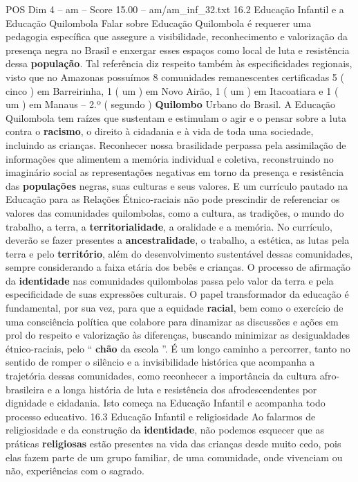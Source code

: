 \begin{textsample}{POS Dim 4 – am – Score 15.00 – am/am\_inf\_32.txt}  \label{ex:f4_pos_103}
16.2 Educação Infantil e a Educação Quilombola Falar sobre Educação Quilombola é requerer uma pedagogia específica que assegure a visibilidade, reconhecimento e valorização da presença negra no Brasil e enxergar esses espaços como local de luta e resistência dessa \textbf{população}.
Tal referência diz respeito também às especificidades regionais, visto que no Amazonas possuímos 8 comunidades remanescentes certificadas 5 ( cinco ) em Barreirinha, 1 ( um ) em Novo Airão, 1 ( um ) em Itacoatiara e 1 ( um ) em Manaus – 2.º ( segundo ) \textbf{Quilombo} Urbano do Brasil.
A Educação Quilombola tem raízes que sustentam e estimulam o agir e o pensar sobre a luta contra o \textbf{racismo}, o direito à cidadania e à vida de toda uma sociedade, incluindo as crianças.
Reconhecer nossa brasilidade perpassa pela assimilação de informações que alimentem a memória individual e coletiva, reconstruindo no imaginário social as representações negativas em torno da presença e resistência das \textbf{populações} negras, suas culturas e seus valores.
E um currículo pautado na Educação para as Relações Étnico-raciais não pode prescindir de referenciar os valores das comunidades quilombolas, como a cultura, as tradições, o mundo do trabalho, a terra, a \textbf{territorialidade}, a oralidade e a memória.
No currículo, deverão se fazer presentes a \textbf{ancestralidade}, o trabalho, a estética, as lutas pela terra e pelo \textbf{território}, além do desenvolvimento sustentável dessas comunidades, sempre considerando a faixa etária dos bebês e crianças.
O processo de afirmação da \textbf{identidade} nas comunidades quilombolas passa pelo valor da terra e pela especificidade de suas expressões culturais.
O papel transformador da educação é fundamental, por sua vez, para que a equidade \textbf{racial}, bem como o exercício de uma consciência política que colabore para dinamizar as discussões e ações em prol do respeito e valorização às diferenças, buscando minimizar as desigualdades étnico-raciais, pelo “ \textbf{chão} da escola ”.
É um longo caminho a percorrer, tanto no sentido de romper o silêncio e a invisibilidade histórica que acompanha a trajetória dessas comunidades, como reconhecer a importância da cultura afro-brasileira e a longa história de luta e resistência dos afrodescendentes por dignidade e cidadania.
Isto começa na Educação Infantil e acompanha todo processo educativo. 16.3 Educação Infantil e religiosidade Ao falarmos de religiosidade e da construção da \textbf{identidade}, não podemos esquecer que as práticas \textbf{religiosas} estão presentes na vida das crianças desde muito cedo, pois elas fazem parte de um grupo familiar, de uma comunidade, onde vivenciam ou não, experiências com o sagrado.

\end{textsample}
